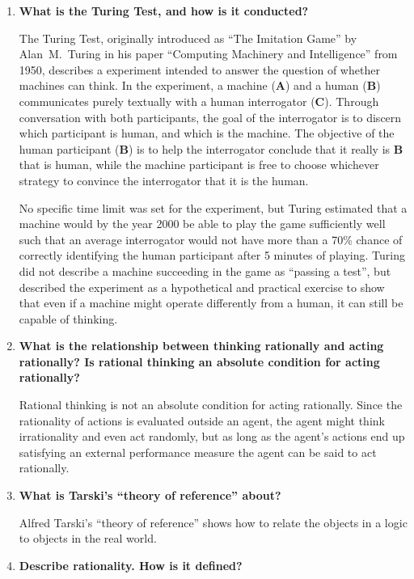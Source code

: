 \begin{enumerate}
\item \textbf{What is the Turing Test, and how is it conducted?}

The Turing Test, originally introduced as ``The Imitation Game'' by Alan~M.~Turing in his paper ``Computing Machinery and Intelligence'' from 1950, describes a experiment intended to answer the question of whether machines can think. In the experiment, a machine (\textbf{A}) and a human (\textbf{B}) communicates purely textually with a human interrogator (\textbf{C}). Through conversation with both participants, the goal of the interrogator is to discern which participant is human, and which is the machine. The objective of the human participant (\textbf{B}) is to help the interrogator conclude that it really is \textbf{B} that is human, while the machine participant is free to choose whichever strategy to convince the interrogator that it is the human.

No specific time limit was set for the experiment, but Turing estimated that a machine would by the year 2000 be able to play the game sufficiently well such that an average interrogator would not have more than a 70\% chance of correctly identifying the human participant after 5 minutes of playing. Turing did not describe a machine succeeding in the game as ``passing a test'', but described the experiment as a hypothetical and practical exercise to show that even if a machine might operate differently from a human, it can still be capable of thinking.

\item \textbf{What is the relationship between thinking rationally and acting rationally? Is rational thinking an absolute condition for acting rationally?}

Rational thinking is not an absolute condition for acting rationally. Since the rationality of actions is evaluated outside an agent, the agent might think irrationality and even act randomly, but as long as the agent's actions end up satisfying an external performance measure the agent can be said to act rationally.

\item \textbf{What is Tarski's ``theory of reference'' about?}

Alfred Tarski's ``theory of reference'' shows how to relate the objects in a logic to objects in the real world.

\item \textbf{Describe rationality. How is it defined?}


\end{enumerate}
